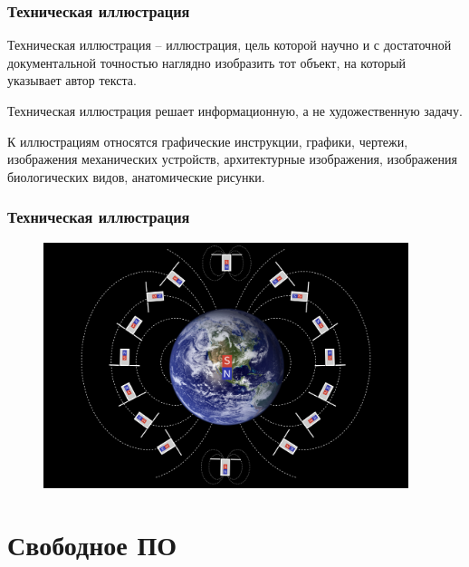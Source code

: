 \documentclass[12pt, compress]{beamer}
\renewcommand{\emph}[1]{\textcolor{dark-blue}{#1}}
\begin{document}
\begin{frame}
\frametitle{Техническая иллюстрация}
\emph{Техническая иллюстрация} -- иллюстрация, цель которой научно и с достаточной документальной точностью наглядно изобразить тот объект, на который указывает автор текста.

\vspace{10pt}

\emph{Техническая иллюстрация} решает информационную, а не художественную задачу. 

\vspace{10pt}

К иллюстрациям относятся графические инструкции, графики, чертежи, изображения механических устройств, архитектурные изображения, изображения биологических видов, анатомические рисунки.
\end{frame}

\begin{frame}
\frametitle{Техническая иллюстрация}
\begin{figure}[htbp]
  \centering
  \includegraphics[width=0.95\textwidth]{PMS.png}
\end{figure}
\end{frame}

\section{Свободное ПО} 
\end{document}
